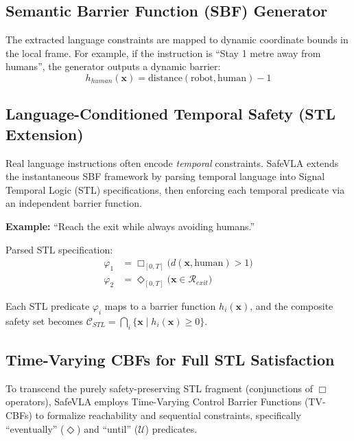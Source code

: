 \documentclass[conference]{IEEEtran}
\begin{document}
\subsection{Semantic Barrier Function (SBF) Generator}
The extracted language constraints are mapped to dynamic coordinate bounds in the local frame. For example, if the instruction is ``Stay 1 metre away from humans'', the generator outputs a dynamic barrier:
\begin{equation}
h_{human}(\mathbf{x}) = \text{distance}(\text{robot}, \text{human}) - 1
\end{equation}

\subsection{Language-Conditioned Temporal Safety (STL Extension)}
Real language instructions often encode \textit{temporal} constraints. SafeVLA extends the instantaneous SBF framework by parsing temporal language into Signal Temporal Logic (STL) specifications, then enforcing each temporal predicate via an independent barrier function.

\noindent\textbf{Example:} ``Reach the exit while always avoiding humans.''

\noindent Parsed STL specification:
\begin{align}
\varphi_1 &= \Box_{[0,T]} \big( d(\mathbf{x}, \text{human}) > 1 \big) \label{eq:stl_always} \\
\varphi_2 &= \Diamond_{[0,T]} \big( \mathbf{x} \in \mathcal{R}_{exit} \big) \label{eq:stl_eventually}
\end{align}

Each STL predicate $\varphi_i$ maps to a barrier function $h_i(\mathbf{x})$, and the composite safety set becomes $\mathcal{C}_{STL} = \bigcap_i \{ \mathbf{x} \mid h_i(\mathbf{x}) \ge 0 \}$.

\subsection{Time-Varying CBFs for Full STL Satisfaction}
To transcend the purely safety-preserving STL fragment (conjunctions of $\Box$ operators), SafeVLA employs Time-Varying Control Barrier Functions (TV-CBFs) to formalize reachability and sequential constraints, specifically ``eventually'' ($\Diamond$) and ``until'' ($\mathcal{U}$) predicates.
\end{document}
